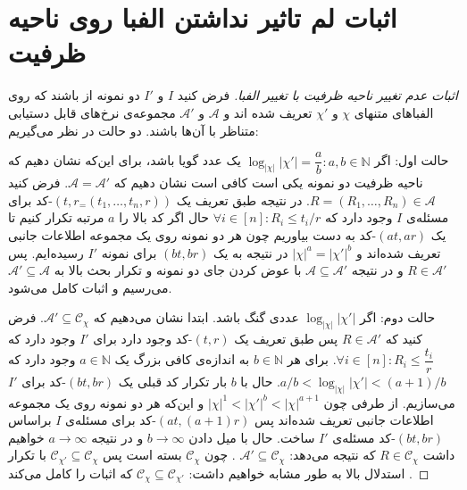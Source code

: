 \chapter{اثبات لم تاثیر نداشتن الفبا روی ناحیه ظرفیت}
\label{appendix:l1}

\begin{proof}[اثبات عدم تغییر ناحیه ظرفیت با تغییر الفبا]
	فرض کنید
	$I$
	و
	$I'$
	دو نمونه از 
	\icod
	باشند که روی الفباهای متنهای
	$\chi$
	و
	$\chi'$
	تعریف شده اند و
	$\mathscr{A}$
	و
	$ \mathscr{A}'$
	مجموعه‌ی نرخ‌های قابل دستیابی متناظر با آن‌ها باشند.
	دو حالت در نظر می‌گیریم:
	
	حالت اول: اگر
	$\log_{|\chi|} |\chi'| = \dfrac{a}{b}: a, b \in \mathbb{N}$
	یک عدد گویا باشد، برای این‌که نشان دهیم که ناحیه ظرفیت دو نمونه یکی است کافی است نشان دهیم که
	$\mathscr{A} = \mathscr{A}'$.
 فرض کنید
	$R = (R_1, \ldots, R_n) \in \mathscr{A}$.
 در نتیجه طبق تعریف یک 
	$(t, r_ = (t_1, \ldots, t_n, r))$-کد
	برای مسئله‌ی
	$I$
	وجود دارد که
	$\forall i \in [n]: R_i \leq t_i / r$
	حال اگر کد بالا را
	$a$
	مرتبه تکرار کنیم تا یک
	$(at, ar)$-کد
	به دست بیاوریم چون هر دو نمونه روی یک مجموعه اطلاعات جانبی تعریف شده‌اند و 
	$|\chi|^a = |\chi'|^b$
	در نتیجه به یک
	$(bt, br)$
	برای نمونه
	$I'$
	رسیده‌ایم. پس
	$R \in \mathscr{A}'$
	و در نتیجه
	$\mathscr{A} \subseteq \mathscr{A}'$
	با عوض کردن جای دو نمونه و تکرار بحث بالا به
		$\mathscr{A}' \subseteq \mathscr{A}$
		می‌رسیم و اثبات کامل می‌شود.
		
		حالت دوم: اگر
		$\log_{|\chi|} |\chi'| $
		عددی گنگ باشد. ابتدا نشان می‌دهیم که
		$\mathscr{A}' \subseteq \mathscr{C}_{\chi}$.
  فرض کنید که
		$R \in \mathscr{A}'$
		پس طبق تعریف یک
		$(t, r)$-کد
		وجود دارد برای
		$I'$
		وجود دارد که
		$\forall i \in [n]: R_i \leq \dfrac{t_i}{r}$.
  برای هر
		$b \in \mathbb{N}$
		به اندازه‌ی کافی بزرگ یک
		$a \in \mathbb{N}$
		وجود دارد که
		$a/b < \log_{|\chi|} |\chi'| < (a+1)/b$.
  حال با
		$b$
		بار تکرار کد قبلی یک 
		$(bt, br)$-کد
		برای
		$I'$
		می‌سازیم. از طرفی چون
		$|\chi|^1 < |\chi'|^b < |\chi|^{a + 1}$
		و این‌که هر دو نمونه روی یک مجموعه اطلاعات جانبی تعریف شده‌اند پس
		$(at, (a+1)r)$-کد
		برای مسئله‌ی
		$I$
		براساس
		$(bt, br)$-کد
		 مسئله‌ی
		 $I'$
		 ساخت. حال با میل دادن
		 $b \rightarrow \infty$
		 و در نتیجه
		 $a \rightarrow \infty$
		 خواهیم داشت
		 $R \in \mathscr{C}_{\chi}$
		  که نتیجه می‌دهد:
		  $\mathscr{A}' \subseteq \mathscr{C}_{\chi}$
		  . چون
		  $\mathscr{C}_{\chi}$
		  بسته است پس
		  $\mathscr{C}_{\chi'} \subseteq \mathscr{C}_{\chi}$
		  با تکرار استدلال بالا به طور مشابه خواهیم داشت:
		  $\mathscr{C}_{\chi} \subseteq \mathscr{C}_{\chi'}$
		  که اثبات را کامل می‌کند \cite{fatemehbook}.
\end{proof}

